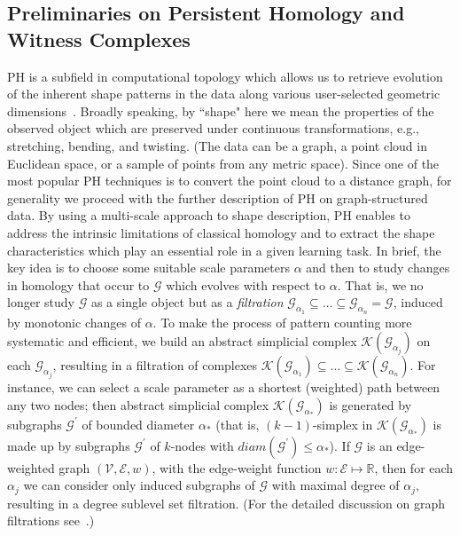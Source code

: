 \documentclass[letterpaper]{article} %
\begin{document}
\subsection{Preliminaries on Persistent Homology and Witness Complexes}
PH is a subfield in computational topology which allows us to retrieve evolution of the inherent shape patterns in the data along various user-selected geometric dimensions~\cite{edelsbrunner2000topological,zomorodian2005computing}. Broadly speaking, by ``shape" here we mean the
properties of the observed object which are preserved under continuous transformations, e.g., stretching, bending, and twisting. (The data can be a graph, a point cloud in Euclidean space, or a sample of points from any metric space). Since one of the most popular PH techniques is to convert the point cloud to a distance graph, for generality we proceed with the further description of PH on graph-structured data. By using a multi-scale approach to shape description, PH enables to address the intrinsic limitations of classical homology and to extract the shape characteristics which play an essential role in a given learning task. In brief, the key idea is to choose some suitable
scale parameters $\alpha$ and then to study changes in homology that occur to $\mathcal{G}$ which evolves with respect to $\alpha$.
That is, we no longer study $\mathcal{G}$ as a single object but as a {\it filtration} $\mathcal{G}_{\alpha_1} \subseteq \ldots \subseteq \mathcal{G}_{\alpha_n}=\mathcal{G}$, induced by monotonic changes of $\alpha$. To make the process of pattern counting more systematic and efficient, we build an abstract simplicial complex $\mathscr{K}(\mathcal{G}_{\alpha_j})$ on each $\mathcal{G}_{\alpha_j}$, resulting in a filtration of complexes $\mathscr{K}(\mathcal{G}_{\alpha_1}) \subseteq \ldots \subseteq \mathscr{K}(\mathcal{G}_{\alpha_n})$.
For instance, we can select a scale parameter as
a shortest (weighted) path between any two nodes; then
abstract simplicial complex $\mathscr{K}(\mathcal{G}_{\alpha_{*}})$ is generated by subgraphs $\mathcal{G}^{'}$ of bounded diameter $\alpha_{*}$ (that is, $(k-1)$-simplex in $\mathscr{K}(\mathcal{G}_{\alpha_{*}})$ is made up by subgraphs $\mathcal{G}^{'}$ of  $k$-nodes with  $diam(\mathcal{G}^{'})\leq \alpha_{*}$).
If $\mathcal{G}$ is an edge-weighted graph $(\mathcal{V}, \mathcal{E}, w)$, with the edge-weight function $w: \mathcal{E} \mapsto \mathbb{R}$, then
for each $\alpha_j$ we can consider only induced subgraphs of $\mathcal{G}$ with maximal degree of $\alpha_j$, resulting in a degree sublevel set filtration.
(For the detailed discussion on graph filtrations see~\citet{hofer2020graph}.)
\end{document}
